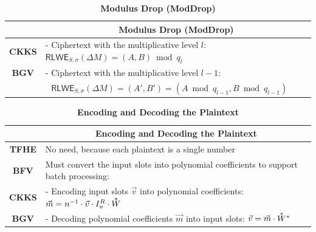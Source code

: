 \begin{table}[h]
\begin{tabular}{|c||l|}
\hline
&\multicolumn{1}{c|}{\textbf{Modulus Drop (\textsf{ModDrop})}}\\\hline\hline
\textbf{CKKS}&- Ciphertext with the multiplicative level $l$: $\textsf{RLWE}_{S, \sigma}(\Delta M) = (A, B)  \bmod q_l$\\
\textbf{BGV}& - Ciphertext with the multiplicative level $l-1$:\\ 
&\textcolor{white}{ - } $\textsf{RLWE}_{S, \sigma}(\Delta M) = (A', B') = (A \bmod q_{l-1}, B \bmod q_{l-1})$\\\hline
\end{tabular}
\caption{\textbf{Modulus Drop (\textsf{ModDrop})}}
\end{table}



\begin{table}[h]
\begin{tabular}{|c||l|}
\hline
&\multicolumn{1}{c|}{\textbf{Encoding and Decoding the Plaintext}}\\\hline\hline
\textbf{TFHE}&No need, because each plaintext is a single number\\\hline
\textbf{BFV}&Must convert the input slots into polynomial coefficients to support batch processing:\\
\textbf{CKKS}&- Encoding input slots $\vec{v}$ into polynomial coefficients: $\vec{m} = n^{-1}\cdot\vec{v}\cdot I_n^R \cdot \hathat W$\\
\textbf{BGV}&- Decoding polynomial coefficients $\vec{m}$ into input slots:  $\vec{v} = \vec{m} \cdot \hathat W^{*}$\\\hline
\end{tabular}
\caption{\textbf{Encoding and Decoding the Plaintext}}
\end{table}



